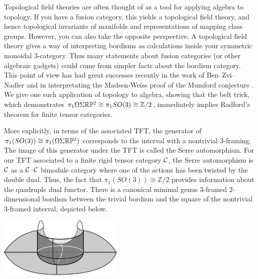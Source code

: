 \documentclass{amsart}
\begin{document}



Topological field theories are often thought of as a tool for applying algebra to topology.  If you have a fusion category, this yields a topological field theory, and hence topological invariants of manifolds and representations of mapping class groups.  However, you can also take the opposite perspective.  A topological field theory gives a way of interpreting bordisms as calculations inside your symmetric monoidal $3$-category.  Thus many statements about fusion categories (or other algebraic gadgets) could come from simpler facts about the bordism category.  This point of view has had great successes recently in the work of Ben--Zvi--Nadler \cite{0904.1247} and in interpretating the Madsen-Weiss proof of the Mumford conjecture \cite{MR2335797, lurie-ch}.  We give one such application of topology to algebra, showing that the belt trick, which demonstrates $\pi_1 \Omega \Sigma \mathbb R \mathbb P^2 \cong \pi_1 SO(3) \cong \mathbb{Z}/2$, immediately implies Radford's theorem for finite tensor categories.







More explicitly, in terms of the associated TFT, the generator of $\pi_1(SO(3)) \cong \pi_1(\Omega \Sigma \mathbb R \mathbb P^2)$ corresponds to the interval with a nontrivial $3$-framing.  The image of this generator under the TFT is called the Serre automorphism.  For our TFT associated to a finite rigid tensor category $\mathcal C$, the Serre automorphism is $\mathcal C$ as a $\mathcal C$--$\mathcal C$ bimodule category where one of the actions has been twisted by the double dual.  Thus, the fact that $\pi_1(SO(3)) \cong \mathbb{Z}/2$ provides information about the quadruple dual functor.  There is a canonical minimal genus $3$-framed $2$-dimensional bordism between the trivial bordism and the square of the nontrivial $3$-framed interval, depicted below.

\begin{center}
\includegraphics[width=60mm]{cobordism.png}
\end{center}
\end{document}
